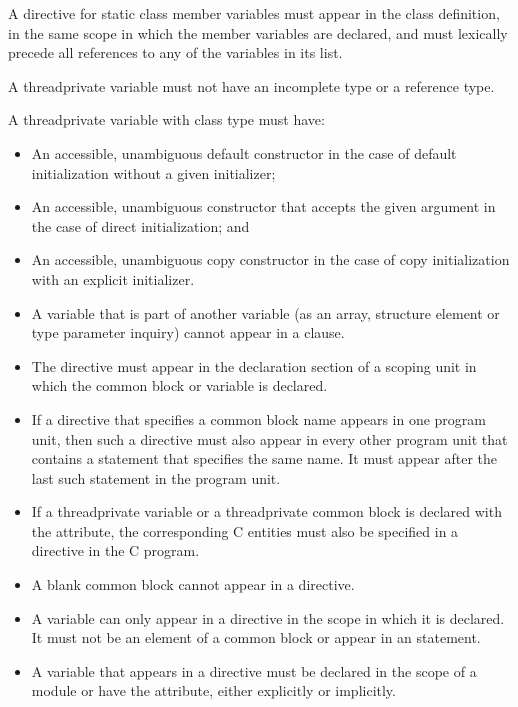 \begin{itemize}
\begin{cppspecific}
\item A  directive for static class member variables must 
      appear in the class definition, in the same scope in which the member 
      variables are declared, and must lexically precede all references to 
      any of the variables in its list.
\item A threadprivate variable must not have an incomplete type or a reference type.
\item A threadprivate variable with class type must have:

\begin{itemize}
\item An accessible, unambiguous default constructor in the case of default 
      initialization without a given initializer;
\item An accessible, unambiguous constructor that accepts the given argument
      in the case of direct initialization; and
\item An accessible, unambiguous copy constructor in the case of copy initialization 
      with an explicit initializer.
\end{itemize}
\end{cppspecific}
\end{itemize}

\begin{fortranspecific}
\begin{itemize}
\item A variable that is part of another variable (as an array, structure element 
      or type parameter inquiry) cannot appear in a  clause.
\item The  directive must appear in the declaration section 
      of a scoping unit in which the common block or variable is declared.
\item If a  directive that specifies a common block name appears 
      in one program unit, then such a directive must also appear in every other 
      program unit that contains a  statement that specifies the same 
      name. It must appear after the last such  statement in the 
      program unit.
\item If a threadprivate variable or a threadprivate common block is declared
      with the  attribute, the corresponding C entities must also be 
      specified in a  directive in the C program.
\item A blank common block cannot appear in a  directive.
\item A variable can only appear in a  directive in the 
      scope in which it is declared. It must not be an element of a common block 
      or appear in an  statement.
\item A variable that appears in a  directive must be declared 
      in the scope of a module or have the  attribute, either explicitly 
      or implicitly.
\end{itemize}
\end{fortranspecific}

